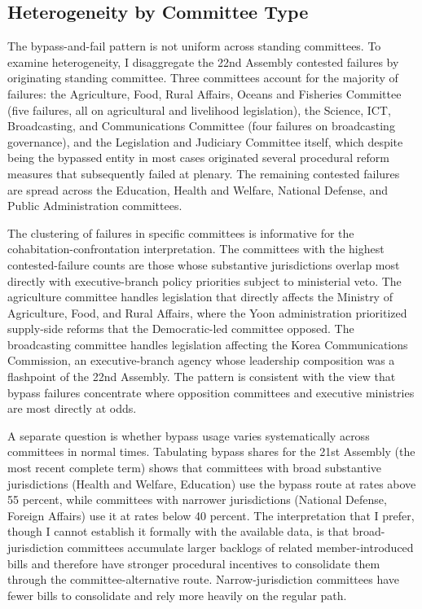 \documentclass[11pt]{article}
\begin{document}
\subsection{Heterogeneity by Committee Type}

The bypass-and-fail pattern is not uniform across standing committees. To examine heterogeneity, I disaggregate the 22nd Assembly contested failures by originating standing committee. Three committees account for the majority of failures: the Agriculture, Food, Rural Affairs, Oceans and Fisheries Committee (five failures, all on agricultural and livelihood legislation), the Science, ICT, Broadcasting, and Communications Committee (four failures on broadcasting governance), and the Legislation and Judiciary Committee itself, which despite being the bypassed entity in most cases originated several procedural reform measures that subsequently failed at plenary. The remaining contested failures are spread across the Education, Health and Welfare, National Defense, and Public Administration committees.

The clustering of failures in specific committees is informative for the cohabitation-confrontation interpretation. The committees with the highest contested-failure counts are those whose substantive jurisdictions overlap most directly with executive-branch policy priorities subject to ministerial veto. The agriculture committee handles legislation that directly affects the Ministry of Agriculture, Food, and Rural Affairs, where the Yoon administration prioritized supply-side reforms that the Democratic-led committee opposed. The broadcasting committee handles legislation affecting the Korea Communications Commission, an executive-branch agency whose leadership composition was a flashpoint of the 22nd Assembly. The pattern is consistent with the view that bypass failures concentrate where opposition committees and executive ministries are most directly at odds.

A separate question is whether bypass usage varies systematically across committees in normal times. Tabulating bypass shares for the 21st Assembly (the most recent complete term) shows that committees with broad substantive jurisdictions (Health and Welfare, Education) use the bypass route at rates above 55 percent, while committees with narrower jurisdictions (National Defense, Foreign Affairs) use it at rates below 40 percent. The interpretation that I prefer, though I cannot establish it formally with the available data, is that broad-jurisdiction committees accumulate larger backlogs of related member-introduced bills and therefore have stronger procedural incentives to consolidate them through the committee-alternative route. Narrow-jurisdiction committees have fewer bills to consolidate and rely more heavily on the regular path.
\end{document}
